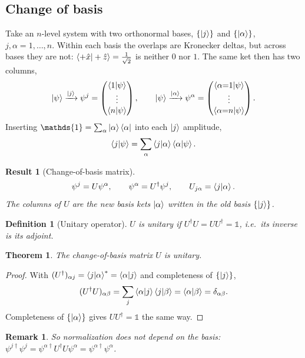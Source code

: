 \documentclass{article}
\newtheorem{theorem}{Theorem}
\newtheorem{definition}{Definition}
\newtheorem{remark}{Remark}
\newtheorem{result}{Result}
\newcommand{\id}{\mathds{1}}
\begin{document}
\subsection{Change of basis}
\label{sec:change-basis}
Take an $n$-level system with two orthonormal bases, $\{\ket{j}\}$ and $\{\ket{\alpha}\}$, $j,\alpha = 1,\dots,n$. Within each basis the overlaps are Kronecker deltas, but across bases they are not: $\braket{+\hat{x}|+\hat{z}} = \tfrac{1}{\sqrt{2}}$ is neither $0$ nor $1$. The same ket then has two columns,
\[\ket{\psi} \xrightarrow{\ket{j}} \psi^{j} = \begin{pmatrix} \braket{1|\psi} \\ \vdots \\ \braket{n|\psi} \end{pmatrix}, \qquad
\ket{\psi} \xrightarrow{\ket{\alpha}} \psi^{\alpha} = \begin{pmatrix} \braket{\alpha{=}1|\psi} \\ \vdots \\ \braket{\alpha{=}n|\psi} \end{pmatrix}.\]
Inserting $\id = \sum_\alpha\ket{\alpha}\bra{\alpha}$ into each $\ket{j}$ amplitude,
\[\braket{j|\psi} = \sum_{\alpha}\braket{j|\alpha}\braket{\alpha|\psi}.\]
\begin{result}[Change-of-basis matrix]
    \begin{equation}
        \psi^{j} = U\psi^{\alpha}, \qquad \psi^{\alpha} = U^\dagger\psi^{j}, \qquad U_{j\alpha} = \braket{j|\alpha}.
    \end{equation}
    The columns of $U$ are the new basis kets $\ket{\alpha}$ written in the old basis $\{\ket{j}\}$.
\end{result}
\begin{definition}[Unitary operator]
    $U$ is unitary if $U^\dagger U = UU^\dagger = \id$, i.e.\ its inverse is its adjoint.
\end{definition}
\begin{theorem}
    The change-of-basis matrix $U$ is unitary.
\end{theorem}
\begin{proof}
    With $(U^\dagger)_{\alpha j} = \braket{j|\alpha}^* = \braket{\alpha|j}$ and completeness of $\{\ket{j}\}$,
    \[(U^\dagger U)_{\alpha\beta} = \sum_j\braket{\alpha|j}\braket{j|\beta} = \braket{\alpha|\beta} = \delta_{\alpha\beta}.\]
    Completeness of $\{\ket{\alpha}\}$ gives $UU^\dagger = \id$ the same way.
\end{proof}
\begin{remark}
    So normalization does not depend on the basis: $\psi^{j\dagger}\psi^{j} = \psi^{\alpha\dagger}U^\dagger U\psi^{\alpha} = \psi^{\alpha\dagger}\psi^{\alpha}$.
\end{remark}
\end{document}

